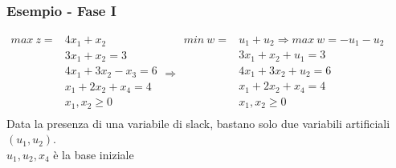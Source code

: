 \documentclass[12pt,a4paper]{article}
\begin{document}
\subsubsection{Esempio - Fase I}
$\begin{array}{cl}max \ z = & 4x_1+x_2\\
& 3x_1+x_2=3\\
& 4x_1+3x_2 -x_3 = 6\\
& x_1 + 2x_2 +x_4 = 4\\
& x_1,x_2 \geq 0\\
\end{array} \Rightarrow \begin{array}{cl}min \ w = & u_1+u_2 \Rightarrow max \ w = -u_1-u_2\\
& 3x_1+x_2 + u_1=3\\
& 4x_1+3x_2 +u_2 = 6\\
& x_1 + 2x_2 +x_4 = 4\\
& x_1,x_2 \geq 0\\
\end{array}$ \\
Data la presenza di una variabile di slack, bastano solo due variabili artificiali $(u_1,u_2)$.\\
$u_1,u_2,x_4$ è la base iniziale
\end{document}
